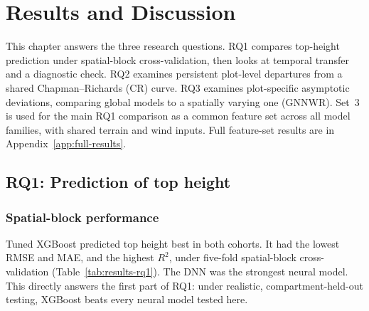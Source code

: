 
\chapter{Results and Discussion}
\label{ch:results}

This chapter answers the three research questions. RQ1 compares top-height prediction under
spatial-block cross-validation, then looks at temporal transfer and a diagnostic check. RQ2
examines persistent plot-level departures from a shared Chapman--Richards (CR) curve. RQ3 examines
plot-specific asymptotic deviations, comparing global models to a spatially varying one (GNNWR).
Set~3 is used for the main RQ1 comparison as a common feature set across all model families, with
shared terrain and wind inputs. Full feature-set results are in Appendix~\ref{app:full-results}.



\section{RQ1: Prediction of top height}
\label{sec:results-rq1}

\subsection{Spatial-block performance}

Tuned XGBoost predicted top height best in both cohorts. It had the lowest RMSE and MAE, and the
highest $R^2$, under five-fold spatial-block cross-validation (Table~\ref{tab:results-rq1}). The
DNN was the strongest neural model. This directly answers the first part of RQ1: under realistic,
compartment-held-out testing, XGBoost beats every neural model tested here.



